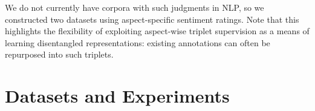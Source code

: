 \documentclass[11pt,a4paper]{article}
\begin{document}
We do not currently have corpora with such judgments in NLP, so we constructed two datasets using aspect-specific sentiment ratings. Note that this highlights the flexibility of exploiting aspect-wise triplet supervision as a means of learning disentangled representations: existing annotations can often be repurposed into such triplets. 






\section{Datasets and Experiments}
\label{section:experiments}
\end{document}
